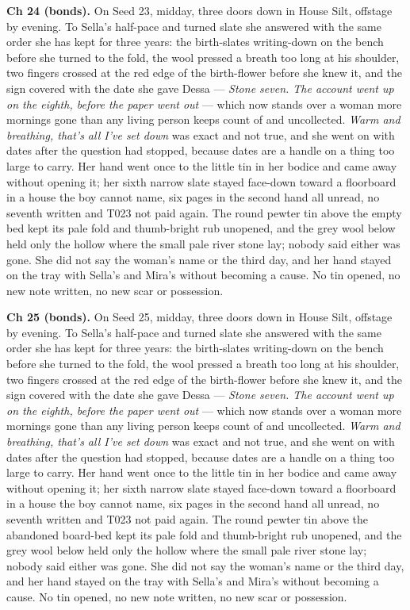 \documentclass{design/chronicle}
\begin{document}
{\textbf{Ch 24 (bonds).} On Seed 23, midday, three doors down in House Silt, offstage by evening. To Sella’s half-pace and turned slate she answered with the same order she has kept for three years: the birth-slates writing-down on the bench before she turned to the fold, the wool pressed a breath too long at his shoulder, two fingers crossed at the red edge of the birth-flower before she knew it, and the sign covered with the date she gave Dessa — \emph{Stone seven. The account went up on the eighth, before the paper went out} — which now stands over a woman more mornings gone than any living person keeps count of and uncollected. \emph{Warm and breathing, that’s all I’ve set down} was exact and not true, and she went on with dates after the question had stopped, because dates are a handle on a thing too large to carry. Her hand went once to the little tin in her bodice and came away without opening it; her sixth narrow slate stayed face-down toward a floorboard in a house the boy cannot name, six pages in the second hand all unread, no seventh written and T023 not paid again. The round pewter tin above the empty bed kept its pale fold and thumb-bright rub unopened, and the grey wool below held only the hollow where the small pale river stone lay; nobody said either was gone. She did not say the woman’s name or the third day, and her hand stayed on the tray with Sella’s and Mira’s without becoming a cause. No tin opened, no new note written, no new scar or possession.

\textbf{Ch 25 (bonds).} On Seed 25, midday, three doors down in House Silt, offstage by evening. To Sella’s half-pace and turned slate she answered with the same order she has kept for three years: the birth-slates writing-down on the bench before she turned to the fold, the wool pressed a breath too long at his shoulder, two fingers crossed at the red edge of the birth-flower before she knew it, and the sign covered with the date she gave Dessa — \emph{Stone seven. The account went up on the eighth, before the paper went out} — which now stands over a woman more mornings gone than any living person keeps count of and uncollected. \emph{Warm and breathing, that’s all I’ve set down} was exact and not true, and she went on with dates after the question had stopped, because dates are a handle on a thing too large to carry. Her hand went once to the little tin in her bodice and came away without opening it; her sixth narrow slate stayed face-down toward a floorboard in a house the boy cannot name, six pages in the second hand all unread, no seventh written and T023 not paid again. The round pewter tin above the abandoned board-bed kept its pale fold and thumb-bright rub unopened, and the grey wool below held only the hollow where the small pale river stone lay; nobody said either was gone. She did not say the woman’s name or the third day, and her hand stayed on the tray with Sella’s and Mira’s without becoming a cause. No tin opened, no new note written, no new scar or possession.

}
\end{document}
